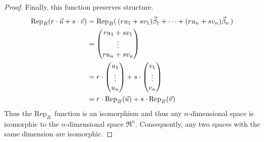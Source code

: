 \begin{proof}
Finally, this function preserves structure.
\begin{align*}
  \rep{r\cdot\vec{u}+s\cdot\vec{v}}{B}
  &=\rep{\,(ru_1+sv_1)\vec{\beta}_1+\dots+(ru_n+sv_n)\vec{\beta}_n\,}{B}  \\
  &=\colvec{ru_1+sv_1 \\ \vdots \\ ru_n+sv_n}  \\
  &=r\cdot\colvec{u_1 \\ \vdots \\ u_n}+s\cdot\colvec{v_1 \\ \vdots \\ v_n} \\
  &=r\cdot\rep{\vec{u}}{B}+s\cdot\rep{\vec{v}}{B}
\end{align*}
Thus the $\mbox{Rep}_B$~function is an isomorphism and thus
any $n$-dimensional space is isomorphic to the $n$-dimensional space $\Re^n$.
Consequently, 
any two spaces with the same dimension are isomorphic.
\end{proof}

